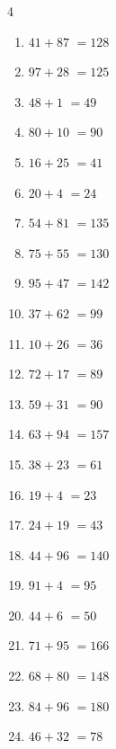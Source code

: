 \begin{multicols}{4}
\begin{enumerate}
  \item $41+87$
        $=128$

  \item $97+28$
        $=125$

  \item $48+1$
        $=49$

  \item $80+10$
        $=90$

  \item $16+25$
        $=41$

  \item $20+4$
        $=24$

  \item $54+81$
        $=135$

  \item $75+55$
        $=130$

  \item $95+47$
        $=142$

  \item $37+62$
        $=99$

  \item $10+26$
        $=36$

  \item $72+17$
        $=89$

  \item $59+31$
        $=90$

  \item $63+94$
        $=157$

  \item $38+23$
        $=61$

  \item $19+4$
        $=23$

  \item $24+19$
        $=43$

  \item $44+96$
        $=140$

  \item $91+4$
        $=95$

  \item $44+6$
        $=50$

  \item $71+95$
        $=166$

  \item $68+80$
        $=148$

  \item $84+96$
        $=180$

  \item $46+32$
        $=78$


\end{enumerate}
\end{multicols}

